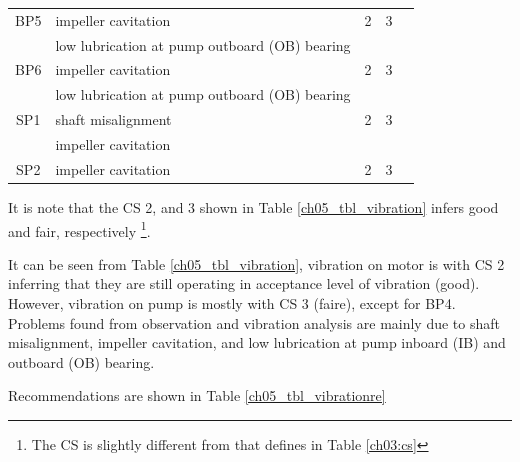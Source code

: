 \begin{table}[!h]
{\begin{tabular}{l|l|l|l|l}
	\hline
	\multicolumn{1}{c|}{BP5} & impeller cavitation & \multicolumn{1}{c|}{2} & \multicolumn{1}{c|}{3} & \multicolumn{1}{c}{} \\ 
	\multicolumn{1}{c|}{} & low lubrication at pump outboard (OB) bearing & \multicolumn{1}{c|}{} & \multicolumn{1}{c|}{} & \multicolumn{1}{c}{} \\ 
	\hline
	\multicolumn{1}{c|}{BP6} & impeller cavitation & \multicolumn{1}{c|}{2} & \multicolumn{1}{c|}{3} & \multicolumn{1}{c}{} \\ 
	\multicolumn{1}{c|}{} & low lubrication at pump outboard (OB) bearing & \multicolumn{1}{c|}{} & \multicolumn{1}{c|}{} & \multicolumn{1}{c}{} \\ 
	\hline
	\multicolumn{1}{c|}{SP1} & shaft misalignment & \multicolumn{1}{c|}{2} & \multicolumn{1}{c|}{3} & \multicolumn{1}{c}{} \\ 
	\multicolumn{1}{c|}{} & impeller cavitation & \multicolumn{1}{c|}{} & \multicolumn{1}{c|}{} & \multicolumn{1}{c}{} \\ 
	\hline
	\multicolumn{1}{c|}{SP2} & impeller cavitation & \multicolumn{1}{c|}{2} & \multicolumn{1}{c|}{3} & \multicolumn{1}{c}{} \\ 
	\hline
\end{tabular}

	}
\end{table}
It is note that the CS 2, and 3 shown in Table \ref{ch05_tbl_vibration} infers good and fair, respectively \footnote{The CS is slightly different from that defines in Table \ref{ch03:cs}}. 

It can be seen from Table \ref{ch05_tbl_vibration}, vibration on motor is with CS 2 inferring that they are still operating in acceptance level of vibration (good). However, vibration on pump is mostly with CS 3 (faire), except for BP4. Problems found from observation and vibration analysis are mainly due to shaft misalignment, impeller cavitation, and low lubrication at pump inboard (IB) and outboard (OB) bearing. 

Recommendations are shown in Table \ref{ch05_tbl_vibrationre}

